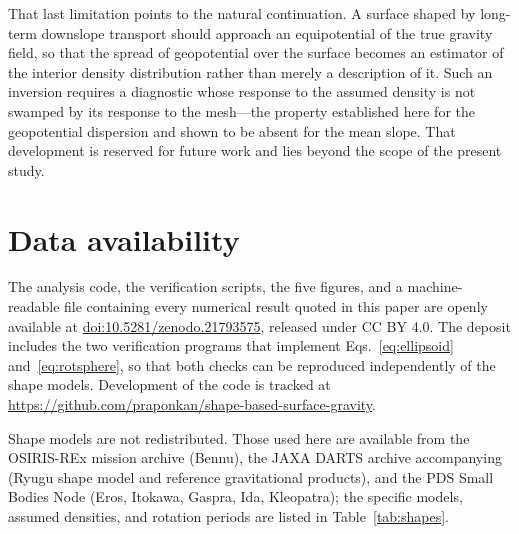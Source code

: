That last limitation points to the natural continuation. A surface shaped by
long-term downslope transport should approach an equipotential of the true
gravity field, so that the spread of geopotential over the surface becomes an
estimator of the interior density distribution rather than merely a description
of it. Such an inversion requires a diagnostic whose response to the assumed
density is not swamped by its response to the mesh---the property established
here for the geopotential dispersion and shown to be absent for the mean slope.
That development is reserved for future work and lies beyond the scope of the
present study.
%
%

\section*{Data availability}

The analysis code, the verification scripts, the five figures, and a
machine-readable file containing every numerical result quoted in this paper
are openly available at
\href{https://doi.org/10.5281/zenodo.21793575}{doi:10.5281/zenodo.21793575},
released under CC BY 4.0. The deposit includes the two verification programs
that implement Eqs.~\eqref{eq:ellipsoid} and~\eqref{eq:rotsphere}, so that both
checks can be reproduced independently of the shape models. Development of the
code is tracked at
\url{https://github.com/praponkan/shape-based-surface-gravity}.

Shape models are not redistributed. Those used here are available from the
OSIRIS-REx mission archive (Bennu), the JAXA DARTS archive accompanying
\citet{kanamaru2019} (Ryugu shape model and reference gravitational products),
and the PDS Small Bodies Node (Eros, Itokawa, Gaspra, Ida, Kleopatra); the
specific models, assumed densities, and rotation periods are listed in
Table~\ref{tab:shapes}.



%
